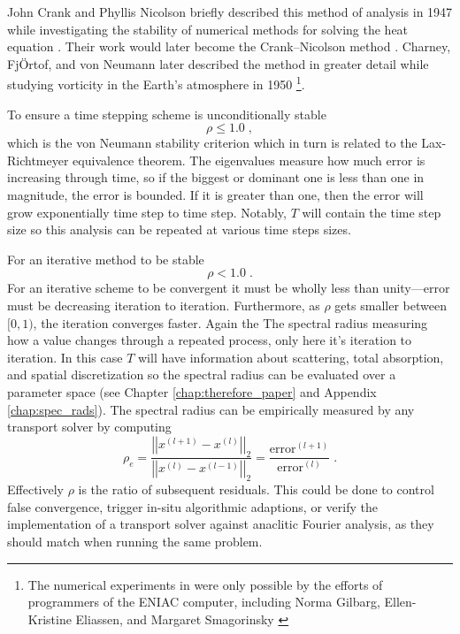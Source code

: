 John Crank and Phyllis Nicolson briefly described this method of analysis in 1947 while investigating the stability of numerical methods for solving the heat equation \cite{nicolson_phd}.
Their work would later become the Crank--Nicolson method \cite{Crank_Nicolson_1947}.
Charney, FjÖrtof, and von Neumann later described the method in greater detail while studying vorticity in the Earth's atmosphere in 1950 \cite{charney_1950_stabilityAnylisys}\footnote{The numerical experiments in \cite{charney_1950_stabilityAnylisys} were only possible by the efforts of programmers of the ENIAC computer, including Norma Gilbarg, Ellen-Kristine Eliassen, and Margaret Smagorinsky \cite{switman_2017_unheralded}}.

To ensure a time stepping scheme is unconditionally stable
\begin{equation}
    \rho \leq 1.0 \; ,
\end{equation}
which is the {von Neumann stability criterion} which in turn is related to the {Lax-Richtmeyer} equivalence theorem.
The eigenvalues measure how much error is increasing through time, so if the biggest or dominant one is less than one in magnitude, the error is bounded.
If it is greater than one, then the error will grow exponentially time step to time step.
Notably, ${T}$ will contain the time step size so this analysis can be repeated at various time steps sizes.

For an iterative method to be stable
\begin{equation}
    \rho < 1.0 \; .
\end{equation}
For an iterative scheme to be convergent it must be wholly less than unity---error must be decreasing iteration to iteration.
Furthermore, as $\rho$ gets smaller between $[0,1)$, the iteration converges faster.
Again the The spectral radius measuring how a value changes through a repeated process, only here it's iteration to iteration.
In this case $T$ will have information about scattering, total absorption, and spatial discretization so the spectral radius can be evaluated over a parameter space (see Chapter \ref{chap:therefore_paper} and Appendix \ref{chap:spec_rads}).
The spectral radius can be empirically measured by any transport solver by computing
\begin{equation}
    \rho_e = \frac{\left|\left|x^{(l+1)} - x^{(l)}\right|\right|_{2}}{\left|\left|x^{(l)} - x^{(l-1)}\right|\right|_{2}} = \frac{\text{error}^{(l+1)}}{\text{error}^{(l)}} \; .
\end{equation}
Effectively $\rho$ is the ratio of subsequent residuals.
This could be done to control false convergence, trigger in-situ algorithmic adaptions, or verify the implementation of a transport solver against anaclitic Fourier analysis, as they should match when running the same problem.

